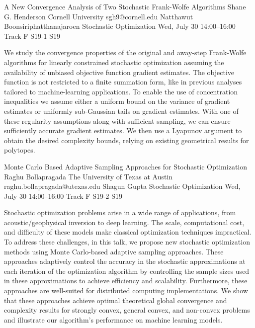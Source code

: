 \begin{talk}
  {A New Convergence Analysis of Two Stochastic Frank-Wolfe Algorithms}%
  {Shane G. Henderson}%
  {Cornell University}%
  {sgh9@cornell.edu}%
  {Natthawut Boonsiriphatthanajaroen}%
  {Stochastic Optimization}%
  {Wed, July 30 14:00–16:00 Track F}%
  {S19-1}%
  {S19}%
				
			
We study the convergence properties of the original and away-step
Frank-Wolfe algorithms for linearly constrained stochastic
optimization assuming the availability of unbiased objective function
gradient estimates. The objective function is not restricted to a
finite summation form, like in previous analyses tailored to
machine-learning applications. To enable the use of concentration
inequalities we assume either a uniform bound on the variance of
gradient estimates or uniformly sub-Gaussian tails on gradient
estimates. With one of these regularity assumptions along with
sufficient sampling, we can ensure sufficiently accurate gradient
estimates. We then use a Lyapunov argument to obtain the desired
complexity bounds, relying on existing geometrical results for
polytopes. 
\end{talk}

\begin{talk}
  {Monte Carlo Based Adaptive Sampling Approaches for Stochastic Optimization}%
  {Raghu Bollapragada}%
  {The University of Texas at Austin}%
  {raghu.bollapragada@utexas.edu}%
  {Shagun Gupta}%
  {Stochastic Optimization}%
  {Wed, July 30 14:00–16:00 Track F}%
  {S19-2}%
  {S19}%
				
			
Stochastic optimization problems arise in a wide range of applications, from acoustic/geophysical inversion to deep learning. The scale, computational cost, and difficulty of these models make classical optimization techniques impractical. To address these challenges, in this talk, we propose new stochastic optimization methods using Monte Carlo-based adaptive sampling approaches. These approaches adaptively control the accuracy in the stochastic approximations at each iteration of the optimization algorithm by controlling the sample sizes used in these approximations to achieve efficiency and scalability. Furthermore, these approaches are well-suited for distributed computing implementations. We show that these approaches achieve optimal theoretical global convergence and complexity results for strongly convex, general convex, and non-convex problems and illustrate our algorithm's performance on machine learning models.

\medskip

\end{talk}

